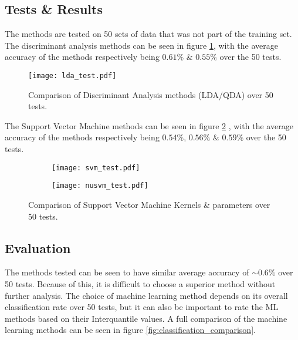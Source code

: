 \documentclass[../main.tex]{subfiles}
\begin{document}
\subsection{Tests \& Results}

The methods are tested on 50 sets of data that was not part of the training set.
The discriminant analysis methods can be seen in figure \ref{fig:lda_test}, with the average accuracy of the methods respectively being $0.61\%$ \& $0.55\%$ over the 50 tests.

\begin{figure}[H]
\begin{center}
\texttt{[image: lda\_test.pdf]}
\caption{Comparison of Discriminant Analysis methods (LDA/QDA) over 50 tests.}
\label{fig:lda_test}
\end{center}
\end{figure}

The Support Vector Machine methods can be seen in figure \ref{fig:svm_test} , with the average accuracy of the methods respectively being $0.54\%$, $0.56\%$ \& $0.59\%$ over the 50 tests.

\begin{figure}[H]
    \centering
    \begin{subfigure}[b]{1\textwidth}
        \centering
\texttt{[image: svm\_test.pdf]}
    \end{subfigure}
    \centering
    \begin{subfigure}[b]{1\textwidth}
        \centering
\texttt{[image: nusvm\_test.pdf]}
    \end{subfigure}
    \caption{Comparison of Support Vector Machine Kernels \& parameters over 50 tests.}
\label{fig:svm_test}
\end{figure}

\subsection{Evaluation}

The methods tested can be seen to have similar average accuracy of $\sim 0.6\%$ over 50 tests.
Because of this, it is difficult to choose a superior method without further analysis.
The choice of machine learning method depends on its overall classification rate over 50 tests, but it can also be important to rate the ML methods based on their Interquantile values.
A full comparison of the machine learning methods can be seen in figure \ref{fig:classification_comparison}.
\end{document}
